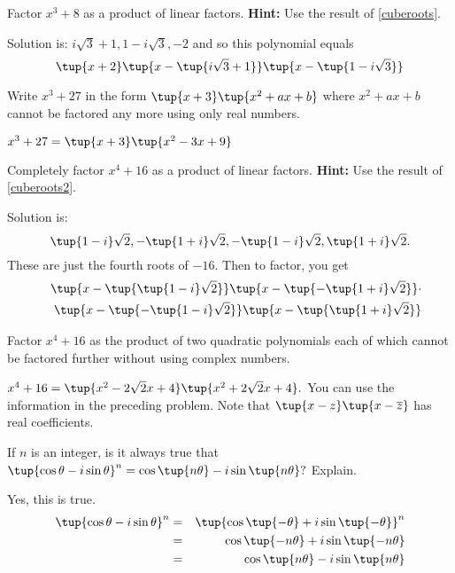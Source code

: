 \begin{enumialphparenastyle}
\begin{ex} Factor $x^{3}+8$ as a product of linear factors. \textbf{Hint:} Use the result of \ref{cuberoots}.
\begin{sol}
Solution
is: $i\sqrt{3}+1,1-i\sqrt{3},-2$ and so this polynomial equals
\[
\tup{x+2} \tup{x-\tup{i\sqrt{3}+1} } \tup{x-\tup{
1-i\sqrt{3}} }
\]
\end{sol}
\end{ex}

\begin{ex} Write $x^{3}+27$ in the form $\tup{x+3} \tup{
x^{2}+ax+b} $ where $x^{2}+ax+b$ cannot be factored any more using
only real numbers. 
\begin{sol}
$x^{3}+27= \tup{x+3} \tup{
x^{2}-3x+9} $
\end{sol}
\end{ex}

\begin{ex} Completely factor $x^{4}+16$ as a product of linear factors. \textbf{Hint:} Use the result of \ref{cuberoots2}. 
\begin{sol}
Solution is:
\[
\tup{1-i} \sqrt{2},-\tup{1+i} \sqrt{2},-\tup{1-i}
\sqrt{2},\tup{1+i} \sqrt{2}.
\]
These are just the fourth roots of $-16$. Then to factor, you get
\begin{eqnarray*}
&&\tup{x-\tup{\tup{1-i} \sqrt{2}} } \tup{x-\tup{
-\tup{1+i} \sqrt{2}} } \cdot \\
&&\tup{x-\tup{-\tup{1-i} \sqrt{2}} } \tup{x-\tup{
\tup{1+i} \allowbreak \sqrt{2}} }
\end{eqnarray*}
\end{sol}
\end{ex}


\begin{ex} Factor $x^{4}+16$ as the product of two quadratic polynomials each of
which cannot be factored further without using complex numbers. 
\begin{sol}
$x^{4}+16=\tup{x^{2}-2\sqrt{2}x+4} \tup{x^{2}+2\sqrt{2}x+4} .
$ You can use the information in the preceding problem. Note that $\tup{
x-z} \tup{x-\overline{z}} $ has real coefficients.
\end{sol}
\end{ex}

\begin{ex} If $n$ is an integer, is it always true that $\tup{\cos \theta
-i\sin \theta } ^{n}=\cos \tup{n\theta } -i\sin \tup{n\theta
} ?$ Explain.
\begin{sol}
Yes, this is true.
\begin{eqnarray*}
\tup{\cos \theta -i\sin \theta } ^{n} &=&\tup{\cos \tup{-\theta
} +i\sin \tup{-\theta } } ^{n} \\
&=&\cos \tup{-n\theta } +i\sin \tup{-n\theta } \\
&=&\cos \tup{n\theta } -i\sin \tup{n\theta }
\end{eqnarray*}
\end{sol}
\end{ex}



\end{enumialphparenastyle}
